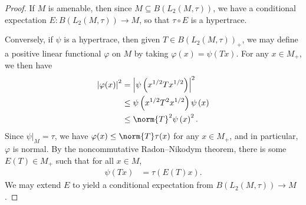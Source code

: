\documentclass[10pt]{mypackage}
\begin{document}
\begin{proof}
  If $M$ is amenable, then since $M\subseteq B\left( L_2\left( M,\tau \right) \right)$, we have a conditional expectation $E\colon B\left( L_2\left( M,\tau \right) \right)\rightarrow M$, so that $\tau\circ E$ is a hypertrace.

  Conversely, if $\psi$ is a hypertrace, then given $T\in B\left( L_2\left( M,\tau \right) \right)_{+}$, we may define a positive linear functional $\varphi$ on $M$ by taking $\varphi(x) = \psi\left( Tx \right)$. For any $x\in M_{+}$, we then have
  \begin{align*}
    \left\vert \varphi(x) \right\vert^2 &= \left\vert \psi\left( x^{1/2}Tx^{1/2} \right) \right\vert^2\\
                                        &\leq \psi\left( x^{1/2}T^2x^{1/2} \right)\psi\left( x \right)\\
                                        &\leq \norm{T}^2\psi\left( x \right)^2.
  \end{align*}
  Since $\psi|_{M} = \tau$, we have $\varphi(x)\leq \norm{T}\tau(x)$ for any $x\in M_{+}$, and in particular, $\varphi$ is normal. By the noncommutative Radon--Nikodym theorem, there is some $E(T)\in M_{+}$ such that for all $x\in M$,
  \begin{align*}
    \psi\left( Tx \right) &= \tau\left( E(T)x \right).
  \end{align*}
  We may extend $E$ to yield a conditional expectation from $B\left( L_2\left( M,\tau \right) \right)\rightarrow M$.
\end{proof}
\end{document}
